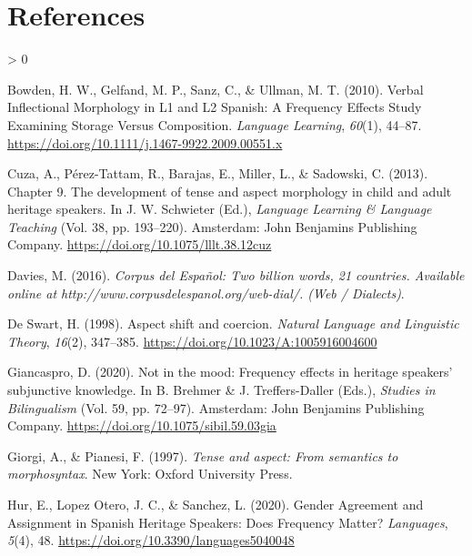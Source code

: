 \documentclass[
  english,
  man,floatsintext]{apa6}
\newlength{\cslhangindent}
\newenvironment{CSLReferences}[2] %
 {%
  \setlength{\parindent}{0pt}
  \ifodd #1 \everypar{\setlength{\hangindent}{\cslhangindent}}\ignorespaces\fi
  \ifnum #2 > 0
  \setlength{\parskip}{#2\baselineskip}
  \fi
 }%
 {}
\begin{document}
\hypertarget{references}{%
\section{References}\label{references}}

\setlength{\parindent}{-0.5in}
\setlength{\leftskip}{0.5in}

\hypertarget{refs}{}
\begin{CSLReferences}{1}{0}
\leavevmode\hypertarget{ref-bowden_verbal_2010}{}%
Bowden, H. W., Gelfand, M. P., Sanz, C., \& Ullman, M. T. (2010). Verbal {Inflectional} {Morphology} in {L1} and {L2} {Spanish}: {A} {Frequency} {Effects} {Study} {Examining} {Storage} {Versus} {Composition}. \emph{Language Learning}, \emph{60}(1), 44--87. \url{https://doi.org/10.1111/j.1467-9922.2009.00551.x}

\leavevmode\hypertarget{ref-schwieter_chapter_2013}{}%
Cuza, A., Pérez-Tattam, R., Barajas, E., Miller, L., \& Sadowski, C. (2013). Chapter 9. {The} development of tense and aspect morphology in child and adult heritage speakers. In J. W. Schwieter (Ed.), \emph{Language {Learning} \& {Language} {Teaching}} (Vol. 38, pp. 193--220). Amsterdam: John Benjamins Publishing Company. \url{https://doi.org/10.1075/lllt.38.12cuz}

\leavevmode\hypertarget{ref-davies_corpus_2016}{}%
Davies, M. (2016). \emph{Corpus del {Español}: {Two} billion words, 21 countries. {Available} online at http://www.corpusdelespanol.org/web-dial/. ({Web} / {Dialects})}.

\leavevmode\hypertarget{ref-de_swart_aspect_1998}{}%
De Swart, H. (1998). Aspect shift and coercion. \emph{Natural Language and Linguistic Theory}, \emph{16}(2), 347--385. \url{https://doi.org/10.1023/A:1005916004600}

\leavevmode\hypertarget{ref-brehmer_not_2020}{}%
Giancaspro, D. (2020). Not in the mood: {Frequency} effects in heritage speakers' subjunctive knowledge. In B. Brehmer \& J. Treffers-Daller (Eds.), \emph{Studies in {Bilingualism}} (Vol. 59, pp. 72--97). Amsterdam: John Benjamins Publishing Company. \url{https://doi.org/10.1075/sibil.59.03gia}

\leavevmode\hypertarget{ref-giorgi_tense_1997}{}%
Giorgi, A., \& Pianesi, F. (1997). \emph{Tense and aspect: From semantics to morphosyntax}. New York: Oxford University Press.

\leavevmode\hypertarget{ref-hur_gender_2020}{}%
Hur, E., Lopez Otero, J. C., \& Sanchez, L. (2020). Gender {Agreement} and {Assignment} in {Spanish} {Heritage} {Speakers}: {Does} {Frequency} {Matter}? \emph{Languages}, \emph{5}(4), 48. \url{https://doi.org/10.3390/languages5040048}


\end{CSLReferences}
\end{document}
